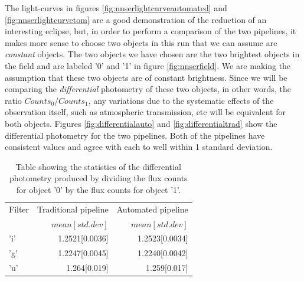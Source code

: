 The light-curves in figures \ref{fig:nnserlightcurveautomated} and \ref{fig:nnserlightcurvetom} are a good demonstration of the reduction of an interesting eclipse, but, in order to perform a comparison of the two pipelines, it makes more sense to choose two objects in this run that we can assume are \emph{constant} objects. The two objects we have chosen are the two brightest objects in the field and are labeled '0' and '1' in figure \ref{fig:nnserfield}. We are making the assumption that these two objects are of constant brightness. Since we will be comparing the \emph{differential} photometry of these two objects, in other words, the ratio $Counts_{0}/Counts_{1}$, any variations due to the systematic effects of the observation itself, such as atmospheric transmission, etc will be equivalent for both objects. Figures \ref{fig:differentialauto} and \ref{fig:differentialtrad} show the differential photometry for the two pipelines. Both of the pipelines have consistent values and agree with each to well within 1 standard deviation.

\begin{table}[ht]
  \label{tab:differential}
  \caption{Table showing the statistics of the differential photometry produced by dividing the flux counts for object '0' by the flux counts for object '1'.}
  \centering
  \begin{tabular}{|l|r|r|}
    \hline
    Filter & Traditional pipeline & Automated pipeline  \\
           &  $mean[std. dev]$    & $mean[std. dev]$ \\
    \hline
    'i'    & 1.2521[0.0036]       & 1.2523[0.0034] \\
    'g'    & 1.2247[0.0045]       & 1.2240[0.0042]\\
    'u'    & 1.264[0.019]         & 1.259[0.017] \\
    \hline
   \end{tabular}
\end{table}


